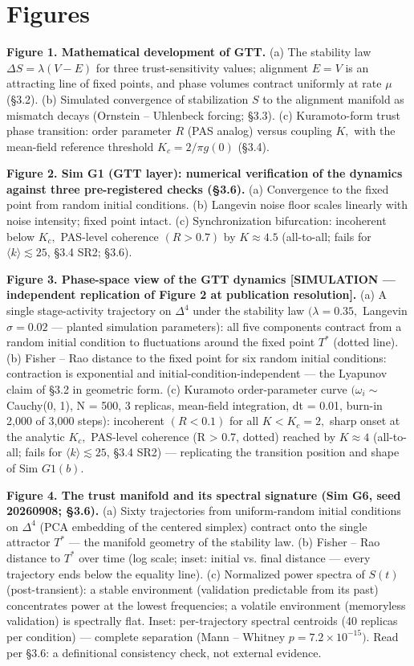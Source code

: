\documentclass[11pt,twocolumn]{article}
\theoremstyle{gttdef}
\theoremstyle{gttplain}
\begin{document}
\section*{Figures}

\textbf{Figure 1. Mathematical development of GTT.} (a) The stability law $\Delta S = \lambda(V - E)$ for three trust-sensitivity values; alignment $E = V$ is an attracting line of fixed points, and phase volumes contract uniformly at rate $\mu$ (\S{}3.2). (b) Simulated convergence of stabilization $S$ to the alignment manifold as mismatch decays (Ornstein -- Uhlenbeck forcing; \S{}3.3). (c) Kuramoto-form trust phase transition: order parameter $R$ (PAS analog) versus coupling $K,$ with the mean-field reference threshold $K_c = 2/\pi g(0)$ (\S{}3.4).

\textbf{Figure 2. Sim G1 (GTT layer): numerical verification of the dynamics against three pre-registered checks (\S{}3.6).} (a) Convergence to the fixed point from random initial conditions. (b) Langevin noise floor scales linearly with noise intensity; fixed point intact. (c) Synchronization bifurcation: incoherent below $K_c,$ PAS-level coherence $(R > 0.7)$ by $K \approx 4.5$ (all-to-all; fails for $\langle k\rangle \lesssim 25$, \S{}3.4 SR2; \S{}3.6).

\textbf{Figure 3. Phase-space view of the GTT dynamics [SIMULATION --- independent replication of Figure 2 at publication resolution].} (a) A single stage-activity trajectory on $\Delta^{4}$ under the stability law $(\lambda = 0.35,$ Langevin $\sigma = 0.02$ --- planted simulation parameters): all five components contract from a random initial condition to fluctuations around the fixed point $T^{*}$ (dotted line). (b) Fisher -- Rao distance to the fixed point for six random initial conditions: contraction is exponential and initial-condition-independent --- the Lyapunov claim of \S{}3.2 in geometric form. (c) Kuramoto order-parameter curve $(\omega_i \sim$ Cauchy(0, 1), N = 500, 3 replicas, mean-field integration, dt = 0.01, burn-in 2,000 of 3,000 steps): incoherent $(R < 0.1)$ for all $K < K_c = 2,$ sharp onset at the analytic $K_c,$ PAS-level coherence (R > 0.7, dotted) reached by $K \approx 4$ (all-to-all; fails for $\langle k\rangle \lesssim 25$, \S{}3.4 SR2) --- replicating the transition position and shape of Sim $G1(b).$

\textbf{Figure 4. The trust manifold and its spectral signature (Sim G6, seed 20260908; \S{}3.6).} (a) Sixty trajectories from uniform-random initial conditions on $\Delta^{4}$ (PCA embedding of the centered simplex) contract onto the single attractor $T^{*}$ --- the manifold geometry of the stability law. (b) Fisher -- Rao distance to $T^{*}$ over time (log scale; inset: initial vs. final distance --- every trajectory ends below the equality line). (c) Normalized power spectra of $S(t)$ (post-transient): a stable environment (validation predictable from its past) concentrates power at the lowest frequencies; a volatile environment (memoryless validation) is spectrally flat. Inset: per-trajectory spectral centroids (40 replicas per condition) --- complete separation (Mann -- Whitney $p = 7.2 \times 10^{-15}).$ Read per \S{}3.6: a definitional consistency check, not external evidence.
\end{document}
